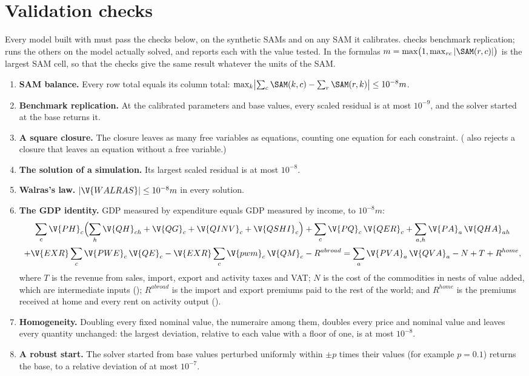 \chapter{Validation checks}\label{chap:checks}

Every model built with \pkg must pass the checks below, on the synthetic SAMs
and on any SAM it calibrates.  checks benchmark
replication;  runs the others on the model actually solved,
and reports each with the value tested. In the formulas $m = \max\bigl(1,
\max_{rc} |\SAM(r, c)|\bigr)$ is the largest SAM cell, so that the checks give
the same result whatever the units of the SAM.

\begin{enumerate}
\item \textbf{SAM balance.} Every row total equals its column total:
$\max_k \bigl|\sum_c \SAM(k, c) - \sum_r \SAM(r, k)\bigr| \le 10^{-8} m$.
\item \textbf{Benchmark replication.} At the calibrated parameters and base
values, every scaled residual is at most $10^{-9}$, and the solver started at
the base returns it.
\item \textbf{A square closure.} The closure leaves as many free variables as
equations, counting one equation for each constraint. (
also rejects a closure that leaves an equation without a free variable.)
\item \textbf{The solution of a simulation.} Its largest scaled residual is
at most $10^{-8}$.
\item \textbf{Walras's law.} $|\V{WALRAS}| \le 10^{-8} m$ in every solution.
\item \textbf{The GDP identity.} GDP measured by expenditure equals GDP
measured by income, to $10^{-8} m$:
\begin{multline*}
\sum_c \V{PH}_c\Bigl(\sum_h \V{QH}_{ch} + \V{QG}_c + \V{QINV}_c + \V{QSHI}_c\Bigr)
  + \sum_c \V{PQ}_c\,\V{QER}_c + \sum_{a,h} \V{PA}_a\,\V{QHA}_{ah}\\
  + \V{EXR}\sum_c \V{PWE}_c\,\V{QE}_c - \V{EXR}\sum_c \V{pwm}_c\,\V{QM}_c - R^{abroad}
  = \sum_a \V{PVA}_a\,\V{QVA}_a - N + T + R^{home},
\end{multline*}
where $T$ is the revenue from sales, import, export and activity taxes and
VAT; $N$ is the cost of the commodities in nests of value added, which are
intermediate inputs (); $R^{abroad}$ is the import and
export premiums paid to the rest of the world; and $R^{home}$ is the premiums
received at home and every rent on activity output ().
\item \textbf{Homogeneity.} Doubling every fixed nominal value, the numeraire
among them, doubles every price and nominal value and leaves every quantity
unchanged: the largest deviation, relative to each value with a floor of one,
is at most $10^{-8}$.
\item \textbf{A robust start.} The solver started from base values perturbed
uniformly within $\pm p$ times their values (for example $p = 0.1$) returns the
base, to a relative deviation of at most $10^{-7}$.
\end{enumerate}
